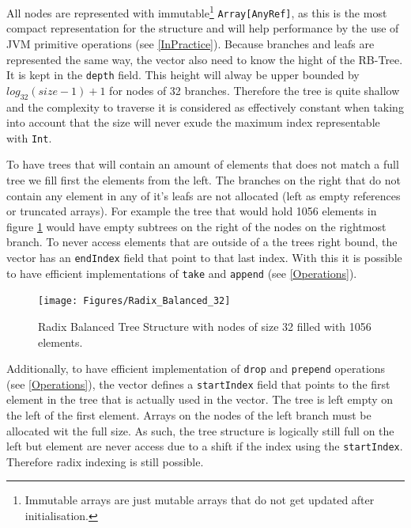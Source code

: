 All nodes are represented with immutable\footnote{Immutable arrays are just mutable arrays that do not get updated after initialisation.} \texttt{Array[AnyRef]}, as this is the most compact representation for the structure and will help performance by the use of JVM primitive operations (see \ref{InPractice}). Because branches and leafs are represented the same way, the vector also need to know the hight of the RB-Tree. It is kept in the \texttt{depth} field. This height will alway be upper bounded by $log_{32}(size-1)+1$ for nodes of 32 branches. Therefore the tree is quite shallow and the complexity to traverse it is considered as effectively constant when taking into account that the size will never exude the maximum index representable with \texttt{Int}.

To have trees that will contain an amount of elements that does not match a full tree we fill first the elements from the left. The branches on the right that do not contain any element in any of it's leafs are not allocated (left as empty references or truncated arrays). For example the tree that would hold 1056 elements in figure \ref{badix_balanced_32} would have empty subtrees on the right of the nodes on the rightmost branch. To never access elements that are outside of a the trees right bound, the vector has an \texttt{endIndex} field that point to that last index. With this it is possible to have efficient implementations of  \texttt{take} and \texttt{append} (see \ref{Operations}).

\begin{figure}[h!]
  \centering
  \texttt{[image: Figures/Radix\_Balanced\_32]}
  \caption{Radix Balanced Tree Structure with nodes of size 32 filled with 1056 elements.}
   \label{badix_balanced_32}
\end{figure}

Additionally, to have efficient implementation of \texttt{drop} and \texttt{prepend} operations (see \ref{Operations}), the vector defines a \texttt{startIndex} field that points to the first element in the tree that is actually used in the vector. The tree is left empty on the left of the first element. Arrays on the nodes of the left branch must be allocated wit the full size. As such, the tree structure is logically still full on the left but element are never access due to a shift if the index using the \texttt{startIndex}. Therefore radix indexing is still possible.

